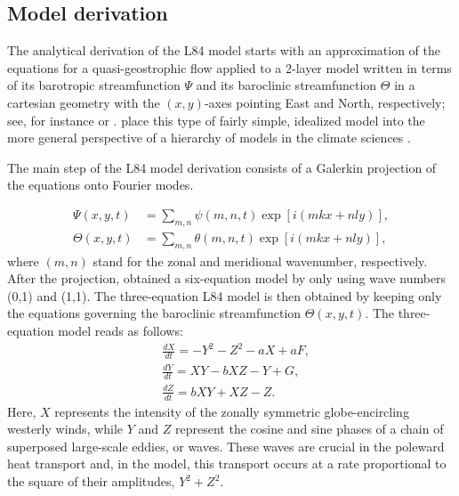 \documentclass[%
 aip, cha,
 amsmath,amssymb,
 reprint,%
author-year,%
]{revtex4-1}
\newcommand{\0}{\mathbf 0}
\begin{document}
\subsection{Model derivation} \label{ssec:derive}
The analytical derivation of the L84 model \citep{vanveen2003} starts with an approximation of the equations for a quasi-geostrophic flow applied to a 2-layer model written in terms of its barotropic streamfunction $\Psi$ and its baroclinic streamfunction $\Theta$ in a cartesian geometry with the $(x,y)$-axes pointing East and North, respectively; see, for instance \cite{Ghil.Chil.1987} or \cite{Kalnay.2003}. \cite{Ghil.Lucar.2020} place this type of fairly simple, idealized model into the more general perspective of a hierarchy of models in the climate sciences \citep{Ghil.2001, Held.2005}.

The main step of the L84 model derivation consists of a Galerkin projection of the equations onto Fourier modes.

\begin{subequations} \label{eq:QG}
	\begin{align}
\Psi(x, y, t) & =  \sum_{m,n} \psi(m, n, t) \exp[i(mkx + nly)], \label{eq:stream} \\
\Theta(x, y, t) & = \sum_{m,n} \theta(m, n, t) \exp[i(mkx + nly)], \label{eq:temp}
\end{align}
\end{subequations}
where $(m,n)$ stand for the zonal and meridional wavenumber, respectively.
After the projection,  \cite{vanveen2003} obtained a six-equation model by only using wave numbers (0,1) and (1,1). The three-equation L84 model is then obtained by keeping only the equations governing the baroclinic streamfunction $\Theta(x, y, t)$. The three-equation model reads as follows:
\begin{subequations} \label{eq:L84}
	\begin{align}
& \frac{d X}{d t} = -Y^2 -Z^2 - aX + aF, \label{l84a} \\
& \frac{d Y}{d t} = XY - bXZ - Y + G,  \label{l84b} \\
& \frac{d Z}{d t} = bXY + XZ - Z.  \label{l84c}
\end{align}
\end{subequations}
Here, $X$ represents the intensity of the zonally symmetric globe-encircling westerly winds, while $Y$ and $Z$ represent the cosine and sine phases of a chain of superposed large-scale eddies, or waves. These waves are crucial in the poleward heat transport \citep{lorenz1967} and, in the model, this transport occurs at a rate proportional to the square of their amplitudes, $Y^2 + Z^2$. 
\end{document}
